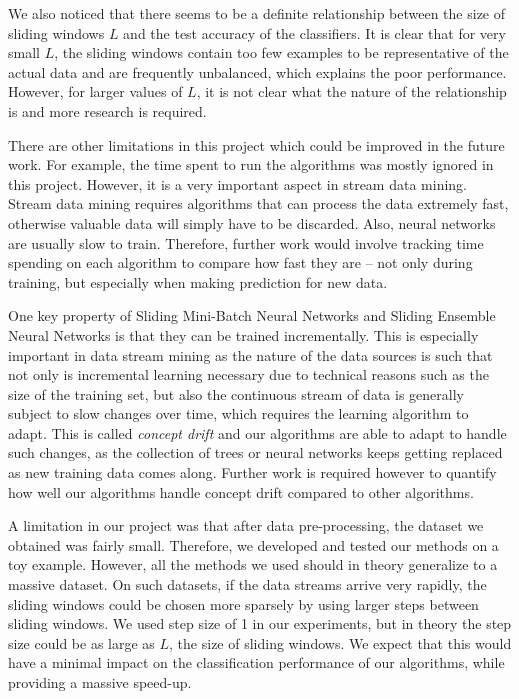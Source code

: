 \documentclass[conference]{IEEEtran}
\begin{document}
We also noticed that there seems to be a definite relationship between the size of sliding windows $L$ and the test accuracy of the classifiers. It is clear that for very small $L$, the sliding windows contain too few examples to be representative of the actual data and are frequently unbalanced, which explains the poor performance. However, for larger values of $L$, it is not clear what the nature of the relationship is and more research is required.

There are other limitations in this project which could be improved in the future work. For example, the time spent to run the algorithms was mostly ignored in this project. However, it is a very important aspect in stream data mining. Stream data mining requires algorithms that can process the data extremely fast, otherwise valuable data will simply have to be discarded. Also, neural networks are usually slow to train. Therefore, further work would involve tracking time spending on each algorithm to compare how fast they are -- not only during training, but especially when making prediction for new data.


One key property of   Sliding Mini-Batch Neural Networks and Sliding Ensemble Neural Networks is that they can be trained incrementally. This is especially important in data stream mining as the nature of the data sources is such that not only is incremental learning necessary due to technical reasons such as the size of the training set, but also the continuous stream of data is generally subject to slow changes over time, which requires the learning algorithm to adapt. This is called \emph{concept drift} and our algorithms are able to adapt to handle such changes, as the collection of trees or neural networks keeps getting replaced as new training data comes along. Further work is required however to quantify how well our algorithms handle concept drift compared to other algorithms.

A limitation in our project was that after data pre-processing, the dataset we obtained was fairly small. Therefore, we developed and tested our methods on a toy example. However, all the methods we used should in theory generalize to a massive dataset. On such datasets, if the data streams arrive very rapidly, the sliding windows could be chosen more sparsely by using larger steps between sliding windows. We used step size of 1 in our experiments, but in theory the step size could be as large as $L$, the size of sliding windows. We expect that this would have a minimal impact on the classification performance of our algorithms, while providing a massive speed-up.
\end{document}
